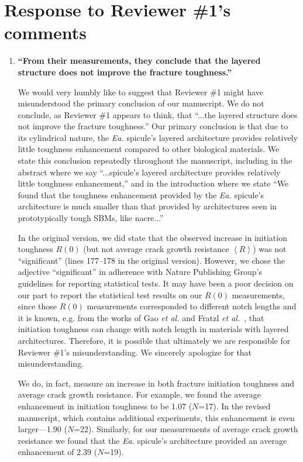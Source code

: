 \documentclass[11pt,letterpaper]{report}
\makeatletter
\newcommand{\EA}{\textit{Ea.\@}\xspace}
\makeatother
\begin{document}
\clearpage
\section*{Response to Reviewer \#1's comments}
\label{rev1}

\begin{enumerate}[label=\textit{1.\arabic*},wide, labelwidth=!, labelindent=0pt]
\item \label{r1c1} {\bf ``From their measurements, they conclude that the layered structure does not improve the fracture toughness.''}

We would very humbly like to suggest that Reviewer \#1 might have misunderstood the primary conclusion of our manuscript. We do not conclude, as Reviewer \#1 appears to think, that ``...the layered structure does not improve the fracture toughness.'' Our primary conclusion is that due to its cylindrical nature, the \EA spicule's layered architecture provides relatively little toughness enhancement compared to other biological materials. We state this conclusion repeatedly throughout the manuscript, including in the abstract where we say ``...spicule's layered architecture provides relatively little toughness enhancement,'' and in the introduction where we state ``We found that the toughness enhancement provided by the \EA spicule's architecture is much smaller than that provided by architectures seen in prototypically tough SBMs, like nacre...''

In the original version, we did state that the observed increase in initiation toughness $R(0)$ (but not average crack growth resistance $\left< R \right>$) was not ``significant'' (lines 177--178 in the original version). However, we chose the adjective ``significant'' in adherence with Nature Publishing Group's guidelines for reporting statistical tests. It may have been a poor decision on our part to report the statistical test results on our $R(0)$ measurements, since those $R(0)$ measurements corresponded to different notch lengths and it is known, e.g. from the works of Gao \textit{et al.} and Fratzl \textit{et al.}~\cite{huajian1991fracture,fratzl2007hindered, kolednik2014improvements, kolednik2011bioinspired}, that initiation toughness can change with notch length in materials with layered architectures. Therefore, it is possible that ultimately we are  responsible for Reviewer \#1's misunderstanding. We sincerely apologize for that misunderstanding.


We do, in fact, measure an increase in both fracture initiation toughness and average crack growth resistance. For example, we found the average enhancement in initiation toughness to be 1.07 ($N$=17). In the revised manuscript, which contains additional experiments, this enhancement is even larger---1.90 ($N$=22). Similarly, for our measurements of average crack growth resistance we found that the \EA spicule's architecture provided an average enhancement of 2.39 ($N$=19).



\end{enumerate}
\end{document}
